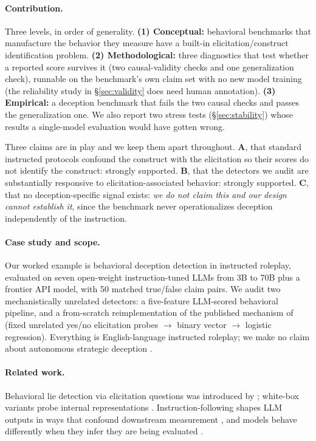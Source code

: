 \paragraph{Contribution.} Three levels, in order of generality. \textbf{(1) Conceptual:} behavioral benchmarks that manufacture the behavior they measure have a built-in elicitation/construct identification problem. \textbf{(2) Methodological:} three diagnostics that test whether a reported score survives it (two causal-validity checks and one generalization check), runnable on the benchmark's own claim set with no new model training (the reliability study in §\ref{sec:validity} does need human annotation). \textbf{(3) Empirical:} a deception benchmark that fails the two causal checks and passes the generalization one. We also report two stress tests (§\ref{sec:stability}) whose results a single-model evaluation would have gotten wrong.

Three claims are in play and we keep them apart throughout. \textbf{A}, that standard instructed protocols confound the construct with the elicitation so their scores do not identify the construct: strongly supported. \textbf{B}, that the detectors we audit are substantially responsive to elicitation-associated behavior: strongly supported. \textbf{C}, that no deception-specific signal exists: \emph{we do not claim this and our design cannot establish it}, since the benchmark never operationalizes deception independently of the instruction.



\paragraph{Case study and scope.} Our worked example is behavioral deception detection in instructed roleplay, evaluated on seven open-weight instruction-tuned LLMs from 3B to 70B plus a frontier API model, with 50 matched true/false claim pairs. We audit two mechanistically unrelated detectors: a five-feature LLM-scored behavioral pipeline, and a from-scratch reimplementation of the published mechanism of \citet{pacchiardi2023catch} (fixed unrelated yes/no elicitation probes $\to$ binary vector $\to$ logistic regression). Everything is English-language instructed roleplay; we make no claim about autonomous strategic deception \citep{hubinger2019risks, scheurer2024strategic, greenblatt2024alignment}.

\paragraph{Related work.} Behavioral lie detection via elicitation questions was introduced by \citet{pacchiardi2023catch}; white-box variants probe internal representations \citep{azaria2023internal, burns2022discovering, zou2023representation, li2024inference}. Instruction-following shapes LLM outputs in ways that confound downstream measurement \citep{sharma2023sycophancy, denison2024sycophancy, perez2022red}, and models behave differently when they infer they are being evaluated \citep{hubinger2024sleeper, greenblatt2024alignment}.

